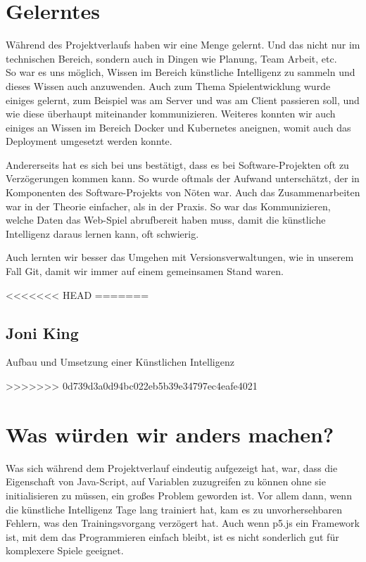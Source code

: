 \section{Gelerntes}
Während des Projektverlaufs haben wir eine Menge gelernt. Und das nicht nur im technischen
Bereich, sondern auch in Dingen wie Planung, Team Arbeit, etc. \\
So war es uns möglich, Wissen im Bereich künstliche Intelligenz zu sammeln und dieses Wissen auch anzuwenden. 
Auch zum Thema Spielentwicklung wurde einiges gelernt, zum Beispiel was am Server und was am Client passieren soll, und wie diese überhaupt miteinander kommunizieren.
Weiteres konnten wir auch einiges an Wissen im Bereich Docker und Kubernetes aneignen, womit auch das Deployment umgesetzt werden konnte.

Andererseits hat es sich bei uns bestätigt, dass es bei Software-Projekten oft zu Verzögerungen kommen kann.
So wurde oftmals der Aufwand unterschätzt, der in Komponenten des Software-Projekts von Nöten war. 
Auch das Zusammenarbeiten war in der Theorie einfacher, als in der Praxis. So war das Kommunizieren, welche Daten das Web-Spiel abrufbereit haben muss, damit die künstliche Intelligenz daraus lernen kann, oft schwierig.

Auch lernten wir besser das Umgehen mit Versionsverwaltungen, wie in unserem Fall Git, damit wir immer auf einem gemeinsamen Stand waren.

<<<<<<< HEAD
=======
\subsection{Joni King}
\begin{compactitem}
    \item
    \item Aufbau und Umsetzung einer Künstlichen Intelligenz
\end{compactitem}
>>>>>>> 0d739d3a0d94bc022eb5b39e34797ec4eafe4021
\section{Was würden wir anders machen?}
Was sich während dem Projektverlauf eindeutig aufgezeigt hat, war, dass die Eigenschaft von Java-Script, auf Variablen zuzugreifen zu können ohne sie initialisieren zu müssen, ein großes Problem geworden ist.
Vor allem dann, wenn die künstliche Intelligenz Tage lang trainiert hat, kam es zu unvorhersehbaren Fehlern, was den Trainingsvorgang verzögert hat. 
Auch wenn p5.js ein Framework ist, mit dem das Programmieren einfach bleibt, ist es nicht sonderlich gut für komplexere Spiele geeignet. 


